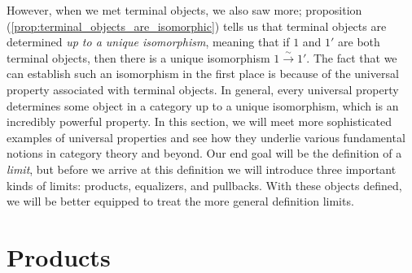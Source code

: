 \documentclass[10pt,oneside]{book}
\newcommand{\isom}{\xrightarrow{\sim}}
\theoremstyle{plain}
\theoremstyle{definition}
\theoremstyle{remark}
\numberwithin{equation}{section}
\numberwithin{figure}{section}
\begin{document}
However, when we met terminal objects, we also saw more; proposition (\ref{prop:terminal_objects_are_isomorphic}) tells us that terminal objects are determined \emph{up to a unique isomorphism}, meaning that if $1$ and $1'$ are both terminal objects, then there is a unique isomorphism $1 \isom 1'$. The fact that we can establish such an isomorphism in the first place is because of the universal property associated with terminal objects. In general, every universal property determines some object in a category up to a unique isomorphism, which is an incredibly powerful property. In this section, we will meet more sophisticated examples of universal properties and see how they underlie various fundamental notions in category theory and beyond. Our end goal will be the definition of a \emph{limit}, but before we arrive at this definition we will introduce three important kinds of limits: products, equalizers, and pullbacks. With these objects defined, we will be better equipped to treat the more general definition limits. 


\section{Products}
\end{document}
